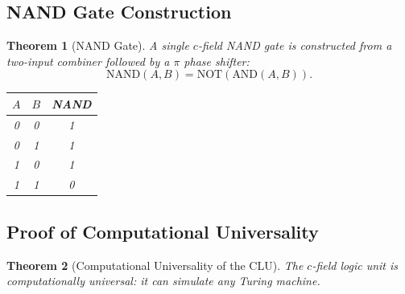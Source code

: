 \documentclass[aps,prd,twocolumn,superscriptaddress,nofootinbib,floatfix]{revtex4-2}
\newtheorem{theorem}{Theorem}
\begin{document}
\subsection{NAND Gate Construction}

\begin{theorem}[NAND Gate]
A single $c$-field NAND gate is constructed from a two-input
combiner followed by a $\pi$ phase shifter:
\begin{equation}
\text{NAND}(A,B) = \text{NOT}(\text{AND}(A,B)).
\end{equation}

\begin{center}
\begin{tabular}{cc|c}
$A$ & $B$ & NAND \\
\hline
0 & 0 & 1 \\
0 & 1 & 1 \\
1 & 0 & 1 \\
1 & 1 & 0 \\
\end{tabular}
\end{center}
\end{theorem}

\subsection{Proof of Computational Universality}

\begin{theorem}[Computational Universality of the CLU]
The $c$-field logic unit is computationally universal:
it can simulate any Turing machine.
\end{theorem}
\end{document}
